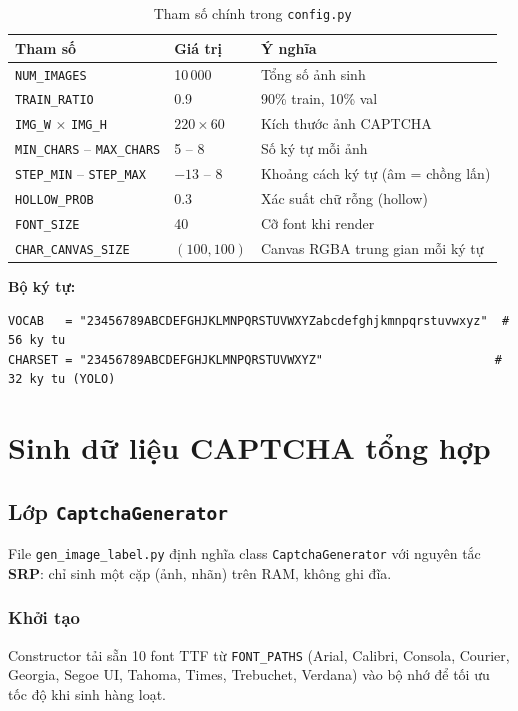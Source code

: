 \documentclass[a4paper,12pt]{report}
\begin{document}
\begin{table}[H]
  \centering
  \caption{Tham số chính trong \texttt{config.py}}
  \begin{tabular}{lll}
    \toprule
    \textbf{Tham số} & \textbf{Giá trị} & \textbf{Ý nghĩa} \\
    \midrule
    \texttt{NUM\_IMAGES} & 10\,000 & Tổng số ảnh sinh \\
    \texttt{TRAIN\_RATIO} & 0.9 & 90\% train, 10\% val \\
    \texttt{IMG\_W} $\times$ \texttt{IMG\_H} & $220 \times 60$ & Kích thước ảnh CAPTCHA \\
    \texttt{MIN\_CHARS} -- \texttt{MAX\_CHARS} & 5 -- 8 & Số ký tự mỗi ảnh \\
    \texttt{STEP\_MIN} -- \texttt{STEP\_MAX} & $-13$ -- $8$ & Khoảng cách ký tự (âm = chồng lấn) \\
    \texttt{HOLLOW\_PROB} & 0.3 & Xác suất chữ rỗng (hollow) \\
    \texttt{FONT\_SIZE} & 40 & Cỡ font khi render \\
    \texttt{CHAR\_CANVAS\_SIZE} & $(100, 100)$ & Canvas RGBA trung gian mỗi ký tự \\
    \bottomrule
  \end{tabular}
\end{table}

\textbf{Bộ ký tự:}
\begin{lstlisting}
VOCAB   = "23456789ABCDEFGHJKLMNPQRSTUVWXYZabcdefghjkmnpqrstuvwxyz"  # 56 ky tu
CHARSET = "23456789ABCDEFGHJKLMNPQRSTUVWXYZ"                        # 32 ky tu (YOLO)
\end{lstlisting}

\chapter{Sinh dữ liệu CAPTCHA tổng hợp}

\section{Lớp \texttt{CaptchaGenerator}}
File \texttt{gen\_image\_label.py} định nghĩa class \texttt{CaptchaGenerator} với nguyên tắc \textbf{SRP}: chỉ sinh một cặp (ảnh, nhãn) trên RAM, không ghi đĩa.

\subsection{Khởi tạo}
Constructor tải sẵn 10 font TTF từ \texttt{FONT\_PATHS} (Arial, Calibri, Consola, Courier, Georgia, Segoe UI, Tahoma, Times, Trebuchet, Verdana) vào bộ nhớ để tối ưu tốc độ khi sinh hàng loạt.
\end{document}
